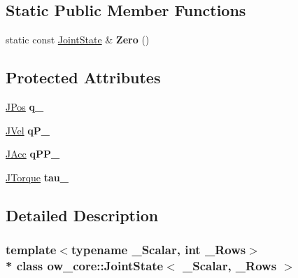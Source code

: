 \subsection*{Static Public Member Functions}
\begin{DoxyCompactItemize}
\item 
static const \hyperlink{classow__core_1_1JointState}{Joint\+State} \& {\bfseries Zero} ()\hypertarget{classow__core_1_1JointState_a2a27c25f103a202e19cbd00339931ef7}{}\label{classow__core_1_1JointState_a2a27c25f103a202e19cbd00339931ef7}

\end{DoxyCompactItemize}
\subsection*{Protected Attributes}
\begin{DoxyCompactItemize}
\item 
\hyperlink{classow__core_1_1JointPosition}{J\+Pos} {\bfseries q\+\_\+}\hypertarget{classow__core_1_1JointState_ae235da7bdc35c9fc7658fc17b0284a0d}{}\label{classow__core_1_1JointState_ae235da7bdc35c9fc7658fc17b0284a0d}

\item 
\hyperlink{classow__core_1_1JointVelocity}{J\+Vel} {\bfseries q\+P\+\_\+}\hypertarget{classow__core_1_1JointState_a1aba4e41fe47b16964cb356a499d235d}{}\label{classow__core_1_1JointState_a1aba4e41fe47b16964cb356a499d235d}

\item 
\hyperlink{classow__core_1_1JointAcceleration}{J\+Acc} {\bfseries q\+P\+P\+\_\+}\hypertarget{classow__core_1_1JointState_adc858e2b394646ed9ff139b162ca3967}{}\label{classow__core_1_1JointState_adc858e2b394646ed9ff139b162ca3967}

\item 
\hyperlink{classow__core_1_1JointEffort}{J\+Torque} {\bfseries tau\+\_\+}\hypertarget{classow__core_1_1JointState_a625cab6fc764fd1e2cba18e3b183fdd6}{}\label{classow__core_1_1JointState_a625cab6fc764fd1e2cba18e3b183fdd6}

\end{DoxyCompactItemize}


\subsection{Detailed Description}
\subsubsection*{template$<$typename \+\_\+\+Scalar, int \+\_\+\+Rows$>$\\*
class ow\+\_\+core\+::\+Joint\+State$<$ \+\_\+\+Scalar, \+\_\+\+Rows $>$}

